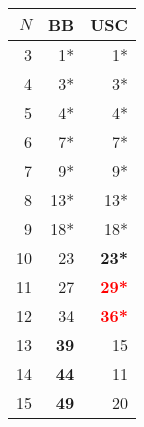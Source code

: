 \begin{tabular}{r|rr}
 \hline
$N$ &BB &USC\\
 \hline
 3&1*&1*\\
 4&3*&3*\\
 5&4*&4*\\
 6&7*&7*\\
 7&9*&9*\\
 8&13*&13*\\
 9&18*&18*\\
 10&23&\textbf{23*}\\
 11&27&\textbf{\textcolor{red}{29*}}\\
 12&34&\textbf{\textcolor{red}{36*}}\\
 13&\textbf{39}&15\\
 14&\textbf{44}&11\\
 15&\textbf{49}&20\\\hline
\end{tabular}

